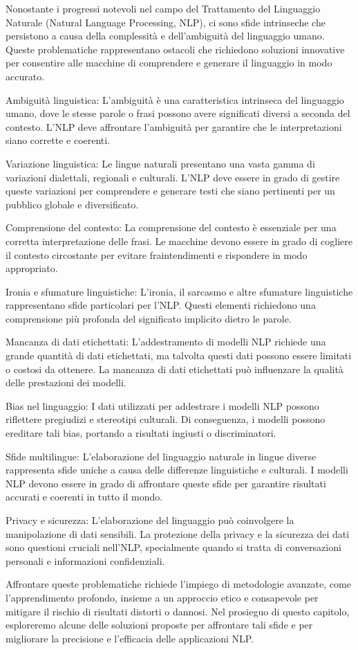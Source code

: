 Nonostante i progressi notevoli nel campo del Trattamento del Linguaggio Naturale (Natural Language Processing, NLP), ci sono sfide intrinseche che persistono a causa della complessità e dell'ambiguità del linguaggio umano. Queste problematiche rappresentano ostacoli che richiedono soluzioni innovative per consentire alle macchine di comprendere e generare il linguaggio in modo accurato.

Ambiguità linguistica: L'ambiguità è una caratteristica intrinseca del linguaggio umano, dove le stesse parole o frasi possono avere significati diversi a seconda del contesto. L'NLP deve affrontare l'ambiguità per garantire che le interpretazioni siano corrette e coerenti.

Variazione linguistica: Le lingue naturali presentano una vasta gamma di variazioni dialettali, regionali e culturali. L'NLP deve essere in grado di gestire queste variazioni per comprendere e generare testi che siano pertinenti per un pubblico globale e diversificato.

Comprensione del contesto: La comprensione del contesto è essenziale per una corretta interpretazione delle frasi. Le macchine devono essere in grado di cogliere il contesto circostante per evitare fraintendimenti e rispondere in modo appropriato.

Ironia e sfumature linguistiche: L'ironia, il sarcasmo e altre sfumature linguistiche rappresentano sfide particolari per l'NLP. Questi elementi richiedono una comprensione più profonda del significato implicito dietro le parole.

Mancanza di dati etichettati: L'addestramento di modelli NLP richiede una grande quantità di dati etichettati, ma talvolta questi dati possono essere limitati o costosi da ottenere. La mancanza di dati etichettati può influenzare la qualità delle prestazioni dei modelli.

Bias nel linguaggio: I dati utilizzati per addestrare i modelli NLP possono riflettere pregiudizi e stereotipi culturali. Di conseguenza, i modelli possono ereditare tali bias, portando a risultati ingiusti o discriminatori.

Sfide multilingue: L'elaborazione del linguaggio naturale in lingue diverse rappresenta sfide uniche a causa delle differenze linguistiche e culturali. I modelli NLP devono essere in grado di affrontare queste sfide per garantire risultati accurati e coerenti in tutto il mondo.

Privacy e sicurezza: L'elaborazione del linguaggio può coinvolgere la manipolazione di dati sensibili. La protezione della privacy e la sicurezza dei dati sono questioni cruciali nell'NLP, specialmente quando si tratta di conversazioni personali e informazioni confidenziali.

Affrontare queste problematiche richiede l'impiego di metodologie avanzate, come l'apprendimento profondo, insieme a un approccio etico e consapevole per mitigare il rischio di risultati distorti o dannosi. Nel prosieguo di questo capitolo, esploreremo alcune delle soluzioni proposte per affrontare tali sfide e per migliorare la precisione e l'efficacia delle applicazioni NLP.
